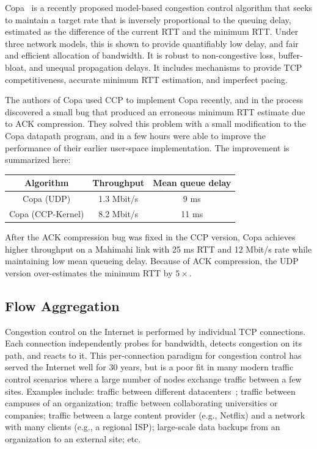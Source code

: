 Copa~\cite{copa} is a recently proposed model-based congestion control algorithm that seeks to maintain a target rate that is inversely proportional to the queuing delay, estimated as the difference of the current RTT and the minimum RTT.
Under three network models, this is shown to provide quantifiably low delay, and fair and efficient allocation of bandwidth.
It is robust to non-congestive loss, buffer-bloat, and unequal propagation delays. It includes mechanisms to provide TCP competitiveness, accurate minimum RTT estimation, and imperfect pacing.

The authors of Copa used CCP to implement Copa recently, and in the process discovered a small bug that produced an erroneous minimum RTT estimate due to ACK compression. They solved this problem with a small modification to the Copa datapath program,
and in a few hours were able to improve the performance of their earlier user-space implementation. The improvement is summarized here:\\

    \begin{tabular}{c|c|c}
        Algorithm & Throughput & Mean queue delay \\
        \hline
        Copa (UDP) & 1.3 Mbit/s & 9 ms\\
        Copa (CCP-Kernel) & 8.2 Mbit/s  & 11 ms\\
    \end{tabular}

\smallskip
After the ACK compression bug was fixed in the CCP version, Copa achieves higher throughput on a Mahimahi link with 25 ms RTT and 12 Mbit/s rate while maintaining low mean queueing delay. Because of ACK compression, the UDP version over-estimates the minimum RTT by $5\times$.

\subsection{Flow Aggregation}
\label{s:capabilities:agg}

Congestion control on the Internet is performed by individual TCP connections. Each connection independently probes for bandwidth, detects congestion on its path, and reacts to it.
This per-connection paradigm for congestion control has served the Internet well for 30 years, but is a poor fit in many modern traffic control scenarios where a large number of nodes exchange traffic between a few sites.
Examples include: traffic between different datacenters~\cite{b4, swan}; traffic between campuses of an organization; traffic between collaborating universities or companies; traffic between a large content provider (e.g., Netflix) and a network with many clients (e.g., a regional ISP); large-scale data backups from an organization to an external site; etc.

